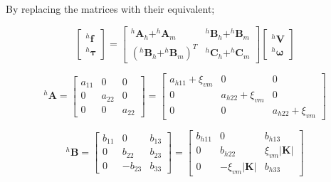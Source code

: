 \documentclass[12pt,a4paper,titlepage]{report}
\begin{document}
By replacing the matrices with their equivalent;

\[
\begin{bmatrix} ^{h}\bm{f}\\ 
^{h}\bm{\tau}\end{bmatrix}  = \begin{bmatrix} ^{h}\bm{A}_{h} + ^{h}\bm{A}_{m} & {^{h}\bm{B}_{h} + ^{h}\bm{B}_{m} }\\ 
({^{h}\bm{B}_{h} + ^{h}\bm{B}_{m} })^{T} & ^{h}\bm{C}_{h} + ^{h}\bm{C}_{m} \end{bmatrix}  \begin{bmatrix} ^{h}\bm{V}
 \\ ^{h}\bm{\omega}
\end{bmatrix}
\]



\begin{equation}
 ^{h}\bm{A} = \begin{bmatrix}
       a_{11}  & 0 		 & 0           \\[0.3em]
       0		 & a_{22}           & 0\\[0.3em]
       0           	& 0 		& a_{22}
     \end{bmatrix}
	=
	 \begin{bmatrix}
       a_{h11}+\xi_{vm}  & 0 		 & 0           \\[0.3em]
       0		 & a_{h22}+\xi_{vm}           & 0\\[0.3em]
       0           	& 0 		& a_{h22}+\xi_{vm}
     \end{bmatrix}
\label{A_finalmatrix}
\end{equation}


\begin{equation}
 ^{h}\bm{B} = \begin{bmatrix}
       b_{11}  & 0 		 & b_{13}        \\[0.3em]
       0		 & b_{22}           & b_{23}\\[0.3em]
       0           	& -b_{23}		& b_{33}
     \end{bmatrix}
	=
	  \begin{bmatrix}
       b_{h11}  & 0 		 & b_{h13}          \\[0.3em]
       0		 & b_{h22}           & \xi_{vm}|\bm{K}|       \\[0.3em]
       0           	& - \xi_{vm}|\bm{K}| 		& b_{h33}
     \end{bmatrix}
\label{B_finalmatrix}
\end{equation}
\end{document}
